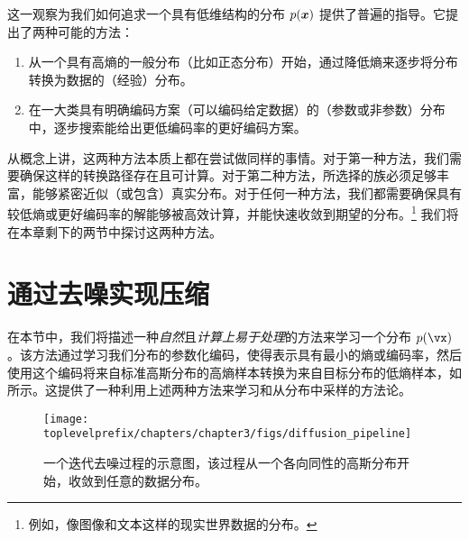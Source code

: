 \documentclass[../../book-main_zh.tex]{subfiles}
\begin{document}
这一观察为我们如何追求一个具有低维结构的分布 $p(\bm{x})$ 提供了普遍的指导。它提出了两种可能的方法：
\begin{enumerate}
	\item 从一个具有高熵的一般分布（比如正态分布）开始，通过降低熵来逐步将分布转换为数据的（经验）分布。
	\item 在一大类具有明确编码方案（可以编码给定数据）的（参数或非参数）分布中，逐步搜索能给出更低编码率的更好编码方案。
\end{enumerate}
从概念上讲，这两种方法本质上都在尝试做同样的事情。对于第一种方法，我们需要确保这样的转换路径存在且可计算。对于第二种方法，所选择的族必须足够丰富，能够紧密近似（或包含）真实分布。对于任何一种方法，我们都需要确保具有较低熵或更好编码率的解能够被高效计算，并能快速收敛到期望的分布。\footnote{例如，像图像和文本这样的现实世界数据的分布。} 我们将在本章剩下的两节中探讨这两种方法。%

\section{通过去噪实现压缩}\label{sub:compression_denoising}

在本节中，我们将描述一种\textit{自然}且\textit{计算上易于处理}的方法来学习一个分布 \(p(\vx)\)。该方法通过学习我们分布的参数化编码，使得表示具有最小的熵或编码率，然后使用这个编码将来自标准高斯分布的高熵样本转换为来自目标分布的低熵样本，如  所示。这提供了一种利用上述两种方法来学习和从分布中采样的方法论。

\begin{figure}[t]
	\centering
	\texttt{[image: \\toplevelprefix/chapters/chapter3/figs/diffusion\_pipeline]}
	\caption{一个迭代去噪过程的示意图，该过程从一个各向同性的高斯分布开始，收敛到任意的数据分布。}
	\label{fig:diffusion-chapter3}
\end{figure}
\end{document}
